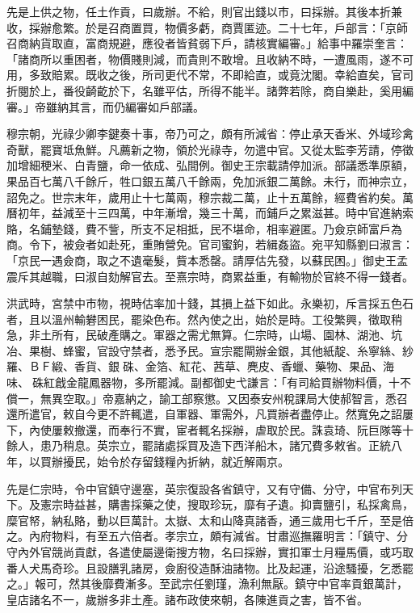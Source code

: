 先是上供之物，任土作貢，曰歲辦。不給，則官出錢以市，曰採辦。其後本折兼收，採辦愈繁。於是召商置買，物價多虧，商賈匿迹。二十七年，戶部言：「京師召商納貨取直，富商規避，應役者皆貧弱下戶，請核實編審。」給事中羅崇奎言：「諸商所以重困者，物價賤則減，而貴則不敢增。且收納不時，一遭風雨，遂不可用，多致賠累。既收之後，所司更代不常，不即給直，或竟沈閣。幸給直矣，官司折閱於上，番役齮齕於下，名雖平估，所得不能半。諸弊若除，商自樂赴，奚用編審。」帝雖納其言，而仍編審如戶部議。

穆宗朝，光祿少卿李鍵奏十事，帝乃可之，頗有所減省：停止承天香米、外域珍禽奇獸，罷寶坻魚鮮。凡薦新之物，領於光祿寺，勿遣中官。又從太監李芳請，停徵加增細稉米、白青鹽，命一依成、弘間例。御史王宗載請停加派。部議悉準原額，果品百七萬八千餘斤，牲口銀五萬八千餘兩，免加派銀二萬餘。未行，而神宗立，詔免之。世宗末年，歲用止十七萬兩，穆宗裁二萬，止十五萬餘，經費省約矣。萬曆初年，益減至十三四萬，中年漸增，幾三十萬，而鋪戶之累滋甚。時中官進納索賂，名鋪墊錢，費不訾，所支不足相抵，民不堪命，相率避匿。乃僉京師富戶為商。令下，被僉者如赴死，重賄營免。官司蜜鉤，若緝姦盜。宛平知縣劉曰淑言：「京民一遇僉商，取之不遺毫髮，貲本悉罄。請厚估先發，以蘇民困。」御史王孟震斥其越職，曰淑自劾解官去。至熹宗時，商累益重，有輸物於官終不得一錢者。

洪武時，宮禁中市物，視時估率加十錢，其損上益下如此。永樂初，斥言採五色石者，且以溫州輸礬困民，罷染色布。然內使之出，始於是時。工役繁興，徵取稍急，非土所有，民破產購之。軍器之需尤無算。仁宗時，山場、園林、湖池、坑冶、果樹、蜂蜜，官設守禁者，悉予民。宣宗罷閘辦金銀，其他紙靛、糸寧絲、紗羅、ＢＦ緞、香貨、銀硃、金箔、紅花、茜草、麂皮、香蠟、藥物、果品、海味、硃紅戧金龍鳳器物，多所罷減。副都御史弋謙言：「有司給買辦物料價，十不償一，無異空取。」帝嘉納之，諭工部察懲。又因泰安州稅課局大使郝智言，悉召還所遣官，敕自今更不許輒遣，自軍器、軍需外，凡買辦者盡停止。然寬免之詔屢下，內使屢敕撤還，而奉行不實，宦者輒名採辦，虐取於民。誅袁琦、阮巨隊等十餘人，患乃稍息。英宗立，罷諸處採買及造下西洋船木，諸冗費多敕省。正統八年，以買辦擾民，始令於存留錢糧內折納，就近解兩京。

先是仁宗時，令中官鎮守邊塞，英宗復設各省鎮守，又有守備、分守，中官布列天下。及憲宗時益甚，購書採藥之使，搜取珍玩，靡有孑遺。抑賣鹽引，私採禽鳥，糜官帑，納私賂，動以巨萬計。太嶽、太和山降真諸香，通三歲用七千斤，至是倍之。內府物料，有至五六倍者。孝宗立，頗有減省。甘肅巡撫羅明言：「鎮守、分守內外官競尚貢獻，各遣使屬邊衛搜方物，名曰採辦，實扣軍士月糧馬價，或巧取番人犬馬奇珍。且設膳乳諸房，僉廚役造酥油諸物。比及起運，沿途騷擾，乞悉罷之。」報可，然其後靡費漸多。至武宗任劉瑾，漁利無厭。鎮守中官率貢銀萬計，皇店諸名不一，歲辦多非土產。諸布政使來朝，各陳進貢之害，皆不省。

